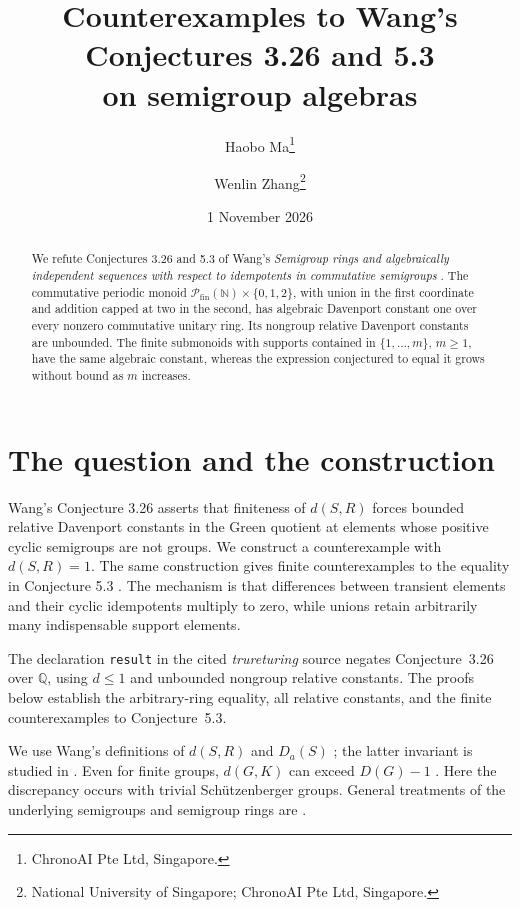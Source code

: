 \documentclass[11pt]{article}
\title{Counterexamples to Wang's Conjectures 3.26 and 5.3\protect\\ on semigroup algebras}
\author{Haobo Ma\thanks{ChronoAI Pte Ltd, Singapore.}
\and Wenlin Zhang\thanks{National University of Singapore; ChronoAI Pte Ltd, Singapore.}}
\date{1 November 2026}
\newcommand{\Pf}{\mathcal P_{\mathrm{fin}}}
\begin{document}
\maketitle
\begin{abstract}
We refute Conjectures 3.26 and 5.3 of Wang's
\emph{Semigroup rings and algebraically independent sequences with respect
to idempotents in commutative semigroups}
\cite[arXiv v1, pp.~23 and 27]{Wang2025}.
The commutative periodic monoid
$\Pf(\mathbb N)\times\{0,1,2\}$, with union in the first coordinate and
addition capped at two in the second, has algebraic Davenport constant one
over every nonzero commutative unitary ring. Its nongroup relative Davenport
constants are unbounded. The finite submonoids with supports contained in
$\{1,\ldots,m\}$, $m\geq1$, have the same algebraic constant,
whereas the expression conjectured to equal it grows without bound as $m$ increases.
\end{abstract}

\section{The question and the construction}

Wang's Conjecture 3.26 \cite[p.~23]{Wang2025} asserts that finiteness of
$d(S,R)$ forces bounded relative Davenport constants in the Green quotient
at elements whose positive cyclic semigroups are not groups. We construct
a counterexample with $d(S,R)=1$. The same construction gives finite
counterexamples to the equality in Conjecture 5.3 \cite[p.~27]{Wang2025}.
The mechanism is that differences between transient elements and their
cyclic idempotents multiply to zero, while unions retain arbitrarily many
indispensable support elements.

The declaration \texttt{result} in the cited \emph{trureturing} source
\cite{Trureturing} negates Conjecture~3.26 over $\mathbb Q$, using
$d\leq1$ and unbounded nongroup relative constants. The proofs below
establish the arbitrary-ring equality, all relative constants, and the
finite counterexamples to Conjecture~5.3.

We use Wang's definitions of $d(S,R)$ \cite[Definition~2.1, p.~8]{Wang2025}
and $D_a(S)$ \cite[Definition~D, p.~9]{Wang2025}; the latter invariant is
studied in \cite{Wang2017}. Even for finite groups, $d(G,K)$ can exceed
$D(G)-1$ \cite[Theorem~1.1]{Smertnig2010}.
Here the discrepancy occurs with trivial Sch\"utzenberger groups.
General treatments of the underlying semigroups and semigroup rings are
\cite{Grillet2001,Gilmer1984}.
\end{document}
